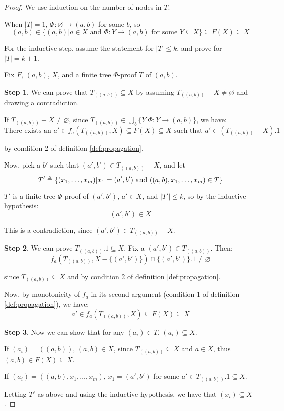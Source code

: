 \documentclass[12pt]{article}
\begin{document}
\begin{proof}
	We use induction on the number of nodes in $T$.

	When $|T|=1$, $\Phi:\varnothing\rightarrow (a,b)$ for some $b$, so
	\[(a,b)\in\{(a,b)|a\in X\text{ and }\Phi:Y\rightarrow (a,b)\text{ for some }Y\subseteq X\}\subseteq F(X)\subseteq X\]

	For the inductive step, assume the statement for $|T|\le k$, and prove for $|T|=k+1$.

	Fix $F$, $(a,b)$, $X$, and a finite tree $\Phi$-proof $T$ of $(a,b)$.

	\noindent\textbf{Step 1}. We can prove that $T_{((a,b))}\subseteq X$ by assuming $T_{((a,b))}-X\neq\varnothing$ and drawing a contradiction.

	If $T_{((a,b))}-X\neq\varnothing$, since $T_{((a,b))}\in\bigcup_b\{Y|\Phi:Y\rightarrow (a,b)\}$, we have:
	\[\text{There exists an }a'\in f_a(T_{((a,b))},X)\subseteq F(X)\subseteq X\text{ such that }a'\in(T_{((a,b))}-X).1\]

	by condition 2 of definition \ref{def:propagation}.

	Now, pick a $b'$ such that $(a',b')\in T_{((a,b))}-X$, and let
	\[T'\triangleq\{(x_1,\dots,x_m)|x_1=(a',b')\text{ and }((a,b),x_1,\dots,x_m)\in T\}\]

	$T'$ is a finite tree $\Phi$-proof of $(a',b')$, $a'\in X$, and $|T'|\le k$, so by the inductive hypothesis:
	\[(a',b')\in X\]

	This is a contradiction, since $(a',b')\in T_{((a,b))}-X$.

	\noindent\textbf{Step 2}. We can prove $T_{((a,b))}.1\subseteq X$. Fix a $(a',b')\in T_{((a,b))}$. Then:
	\[f_a(T_{((a,b))},X-\{(a',b')\})\cap\{(a',b')\}.1\neq\varnothing\]

	since $T_{((a,b))}\subseteq X$ and by condition 2 of definition \ref{def:propagation}.

	Now, by monotonicity of $f_a$ in its second argument (condition 1 of definition \ref{def:propagation}), we have:
	\[a'\in f_a(T_{((a,b))},X)\subseteq F(X)\subseteq X\]

	\noindent\textbf{Step 3}. Now we can show that for any $(a_i)\in T$, $(a_i)\subseteq X$.

	If $(a_i)=((a,b))$, $(a,b)\in X$, since $T_{((a,b))}\subseteq X$ and $a\in X$, thus $(a,b)\in F(X)\subseteq X$.

	If $(a_i)=((a,b),x_1,\dots,x_m)$, $x_1=(a',b')$ for some $a'\in T_{((a,b))}.1\subseteq X$.

	Letting $T'$ as above and using the inductive hypothesis, we have that $(x_i)\subseteq X$.
\end{proof}
\end{document}
